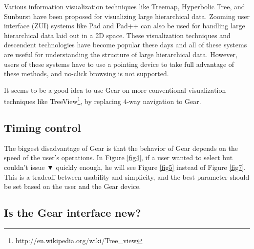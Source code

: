 \documentclass[conference]{IEEEtran}
\def\down{▼}
\begin{document}
Various information visualization techniques like
Treemap\cite{Johnson:1991:TSA:949607.949654},
Hyperbolic Tree\cite{Lamping:1995:FTB:223904.223956},
and Sunburst\cite{Stasko:2000:FDN:857190.857683}
have been proposed for visualizing large hierarchical data.
Zooming user interface (ZUI) systems like
Pad\cite{Perlin:1993:PAA:166117.166125} and
Pad++\cite{Bederson:1994:PZG:192426.192435}
can also be used for handling large hierarchical data laid out in a 2D space.
%
These visualization techniques and descendent technologies have become popular these days and
all of these systems are useful for understanding the structure of
large hierarchical data.
However, users of these systems have to use a pointing device
to take full advantage of these methods, and
no-click browsing is not supported.



It seems to be a good idea to use Gear on more conventional visualization techniques like
TreeView\footnote{
  \textsf{http://en.wikipedia.org/wiki/Tree\_view}
}, by replacing 4-way navigation to Gear.


\subsection{Timing control}

The biggest disadvantage of Gear is that
the behavior of Gear depends on the speed of the user's operations.
In Figure \ref{fig4},
if a user wanted to select  but couldn't issue {\down}
quickly enough, he will see Figure \ref{fig5} instead of Figure \ref{fig7}.
This is a tradeoff between usability and simplicity, and
the best parameter should be set based on the user and the Gear device.

\subsection{Is the Gear interface new?}
\end{document}
